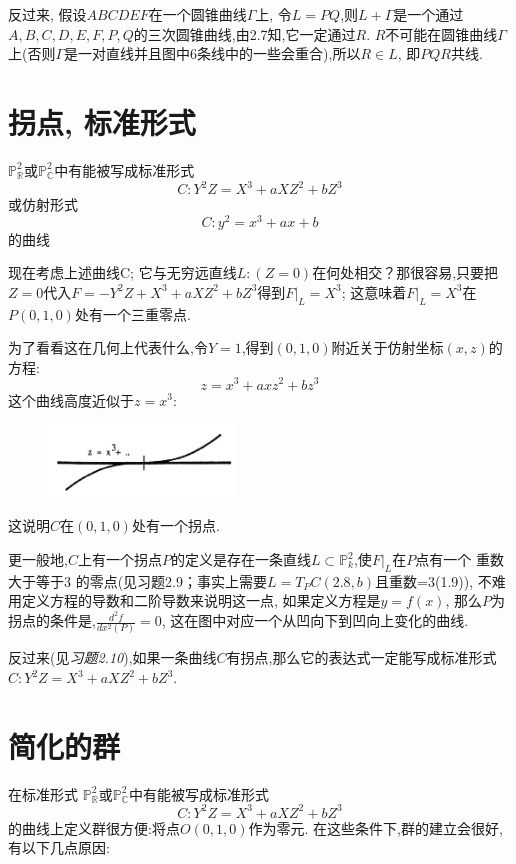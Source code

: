 \documentclass[UTF8]{book}
\begin{document}
		
			反过来, 假设$ ABCDEF $在一个圆锥曲线$\Gamma$上, 令$ L=PQ $,则$L+\Gamma$是一个通过$ A,B,C,D,E,F,P,Q $的三次圆锥曲线,由2.7知,它一定通过$ R $. $ R $不可能在圆锥曲线$\Gamma$上(否则$\Gamma$是一对直线并且图中6条线中的一些会重合),所以$R\in L$, 即$ PQR $共线.
	\section{拐点, 标准形式}
		$\mathbb{P}^{2}_{\mathbb{R}}$或$\mathbb{P}^{2}_{\mathbb{C}}$中有能被写成标准形式
		\begin{equation*}
		C:Y^{2}Z=X^{3}+aXZ^{2}+bZ^{3}
		\end{equation*}
		或仿射形式
		\begin{equation*}
		C:y^{2}=x^{3}+ax+b
		\end{equation*}的曲线
	
		
		现在考虑上述曲线C; 它与无穷远直线$ L:(Z=0) $在何处相交？那很容易,只要把$ Z=0 $代入$F=-Y^{2}Z+X^{3}+aXZ^{2}+bZ^{3}$得到$F|_{L}=X^{3}$; 这意味着$F|_{L}=X^{3}$在$ P(0,1,0) $处有一个三重零点.
		
		为了看看这在几何上代表什么,令$ Y=1 $,得到$ (0,1,0) $附近关于仿射坐标$ (x,z) $的方程:
		\begin{equation*}
		z=x^{3}+axz^{2}+bz^{3}
		\end{equation*}
		这个曲线高度近似于$z=x^{3}$:
		
		
		\begin{figure}[h]
		  \centering
		  \includegraphics[width=5cm]{38.jpg}\\
		\end{figure}
	
	
	
		这说明$ C $在$ (0,1,0) $处有一个拐点.
		
		
		更一般地,$ C $上有一个拐点$ P $的定义是存在一条直线$L\subset \mathbb{P}^{2}_{k}$,使$F|_{L}$在$ P $点有一个 重数大于等于3 的零点(见习题2.9；事实上需要$L=T_{P}C(2.8,b)$且重数=3(1.9)), 不难用定义方程的导数和二阶导数来说明这一点, 如果定义方程是$ y=f(x) $, 那么$ P $为拐点的条件是,$\frac{d^{2}f}{dx^{2}(P)}=0$, 这在图中对应一个从凹向下到凹向上变化的曲线. 
		
		
		反过来(见\textit{习题2.10}),如果一条曲线$ C $有拐点,那么它的表达式一定能写成标准形式$C:Y^{2}Z=X^{3}+aXZ^{2}+bZ^{3}$.
	\section{简化的群}
		在标准形式
		$\mathbb{P}^{2}_{\mathbb{R}}$或$\mathbb{P}^{2}_{\mathbb{C}}$中有能被写成标准形式
		\begin{equation*}
		C:Y^{2}Z=X^{3}+aXZ^{2}+bZ^{3}
		\end{equation*}
		的曲线上定义群很方便:将点$ O(0,1,0) $作为零元. 在这些条件下,群的建立会很好,有以下几点原因:
		
\end{document}
